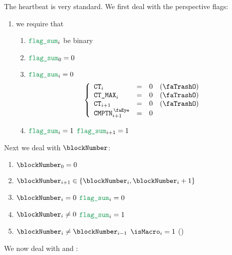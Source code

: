 The heartbeat is very standard.
We first deal with the perspective flags:
\begin{enumerate}
	\item we require that
		\begin{enumerate}
		        \item $\locFlagSum _{i}$ be binary
		        \item $\locFlagSum _{0} = 0$
		        \item \If $\locFlagSum _{i} = 0$ \Then
				\[
					\left\{ \begin{array}{lclr}
						\ct            _{i}      & = & 0 & (\trash) \\
						\maxCt         _{i}      & = & 0 & (\trash) \\
						\ct            _{i  + 1} & = & 0 & (\trash) \\
						\isComputation _{i  + 1} & = & 0 \\
					\end{array} \right.
				\]
		        \item \If $\locFlagSum _{i} = 1$ \Then $\locFlagSum _{i + 1} = 1$
		\end{enumerate}
\end{enumerate}
Next we deal with $\blockNumber$:
\begin{enumerate}[resume]
	\item $\blockNumber _{0} = 0$
	\item $\blockNumber _{i + 1} \in \{ \blockNumber _{i}, \blockNumber _{i} + 1 \}$
	\item \If $\blockNumber _{i} =    0$ \Then $\locFlagSum _{i} = 0$
	\item \If $\blockNumber _{i} \neq 0$ \Then $\locFlagSum _{i} = 1$
	\item \If $\blockNumber _{i} \neq \blockNumber _{i - 1}$ \Then $\isMacro _{i} = 1$ (\trash)
\end{enumerate}
We now deal with \ct{} and \maxCt{}:
